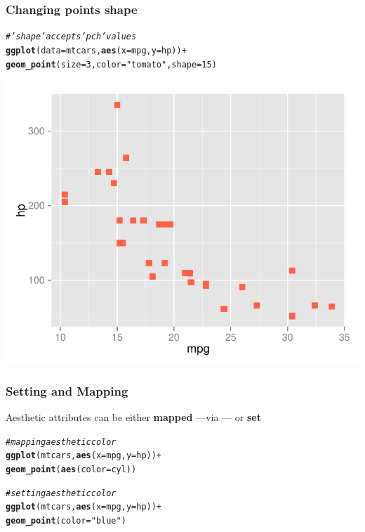 \documentclass[12pt]{beamer}\usepackage[]{graphicx}\usepackage[]{color}
\makeatletter
\newcommand{\hlnum}[1]{\textcolor[rgb]{0.686,0.059,0.569}{#1}}%
\newcommand{\hlstr}[1]{\textcolor[rgb]{0.192,0.494,0.8}{#1}}%
\newcommand{\hlcom}[1]{\textcolor[rgb]{0.678,0.584,0.686}{\textit{#1}}}%
\newcommand{\hlopt}[1]{\textcolor[rgb]{0,0,0}{#1}}%
\newcommand{\hlstd}[1]{\textcolor[rgb]{0.345,0.345,0.345}{#1}}%
\newcommand{\hlkwc}[1]{\textcolor[rgb]{0.333,0.667,0.333}{#1}}%
\newcommand{\hlkwd}[1]{\textcolor[rgb]{0.737,0.353,0.396}{\textbf{#1}}}%
\newenvironment{kframe}{%
 \def\at@end@of@kframe{}%
 \ifinner\ifhmode%
  \def\at@end@of@kframe{\end{minipage}}%
  \begin{minipage}{\columnwidth}%
 \fi\fi%
 \def\FrameCommand##1{\hskip\@totalleftmargin \hskip-\fboxsep
 \colorbox{shadecolor}{##1}\hskip-\fboxsep
     \hskip-\linewidth \hskip-\@totalleftmargin \hskip\columnwidth}%
 \MakeFramed {\advance\hsize-\width
   \@totalleftmargin\z@ \linewidth\hsize
   \@setminipage}}%
 {\par\unskip\endMakeFramed%
 \at@end@of@kframe}
\newenvironment{knitrout}{}{} %
\makeatother
\begin{document}
\begin{frame}[fragile]
\frametitle{Changing points shape}
\begin{knitrout}\scriptsize
{}\color{fgcolor}\begin{kframe}
\begin{alltt}
\hlcom{# 'shape' accepts 'pch' values}
\hlkwd{ggplot}\hlstd{(}\hlkwc{data} \hlstd{= mtcars,} \hlkwd{aes}\hlstd{(}\hlkwc{x} \hlstd{= mpg,} \hlkwc{y} \hlstd{= hp))} \hlopt{+}
  \hlkwd{geom_point}\hlstd{(}\hlkwc{size} \hlstd{=} \hlnum{3}\hlstd{,} \hlkwc{color} \hlstd{=} \hlstr{"tomato"}\hlstd{,} \hlkwc{shape} \hlstd{=} \hlnum{15}\hlstd{)}
\end{alltt}
\end{kframe}

{\centering \includegraphics[width=.7\linewidth,height=.6\linewidth]{figure/xyplot_mtcars4-1} 

}



\end{knitrout}
\end{frame}


\begin{frame}[fragile]
\frametitle{Setting and Mapping}

Aesthetic attributes can be either \textbf{mapped} ---via --- or \textbf{set}

\begin{knitrout}\footnotesize
{}\color{fgcolor}\begin{kframe}
\begin{alltt}
\hlcom{# mapping aesthetic color}
\hlkwd{ggplot}\hlstd{(mtcars,} \hlkwd{aes}\hlstd{(}\hlkwc{x} \hlstd{= mpg,} \hlkwc{y} \hlstd{= hp))} \hlopt{+}
  \hlkwd{geom_point}\hlstd{(}\hlkwd{aes}\hlstd{(}\hlkwc{color} \hlstd{= cyl))}

\hlcom{# setting aesthetic color}
\hlkwd{ggplot}\hlstd{(mtcars,} \hlkwd{aes}\hlstd{(}\hlkwc{x} \hlstd{= mpg,} \hlkwc{y} \hlstd{= hp))} \hlopt{+}
  \hlkwd{geom_point}\hlstd{(}\hlkwc{color} \hlstd{=} \hlstr{"blue"}\hlstd{)}
\end{alltt}
\end{kframe}
\end{knitrout}

\end{frame}
\end{document}
